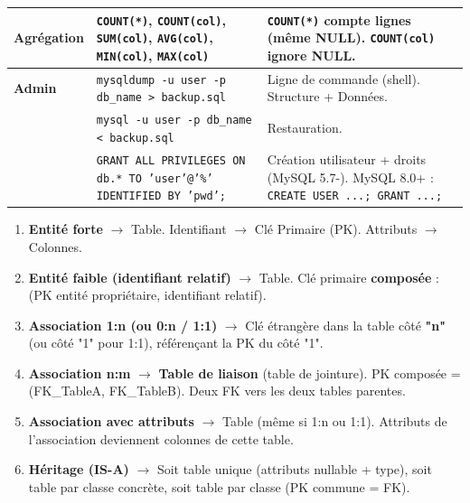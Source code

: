 \documentclass[11pt]{article}
\newcounter{popsec}
\newcounter{popsub}
\newcommand{\courssub}[1]{%
  \stepcounter{popsub}%
  \par\vspace{9pt}\noindent{\popxbold\fontsize{11.5}{13}\selectfont\color{popink}{\color{poporange}\thepopsec.\thepopsub}\hspace{6pt}#1}\par\nopagebreak\vspace{4pt}
}
\begin{document}
\begin{bilan}
\begin{center}
\begin{tabularx}{\linewidth}{|>{\bfseries}l|X|X|}
\hline
\textbf{Agrégation} & \texttt{COUNT(*)}, \texttt{COUNT(col)}, \texttt{SUM(col)}, \texttt{AVG(col)}, \texttt{MIN(col)}, \texttt{MAX(col)} & \texttt{COUNT(*)} compte lignes (même NULL). \texttt{COUNT(col)} ignore NULL. \\
\hline
\textbf{Admin} & \texttt{mysqldump -u user -p db\_name > backup.sql} & Ligne de commande (shell). Structure + Données. \\
& \texttt{mysql -u user -p db\_name < backup.sql} & Restauration. \\
& \texttt{GRANT ALL PRIVILEGES ON db.* TO 'user'@'\%' IDENTIFIED BY 'pwd';} & Création utilisateur + droits (MySQL 5.7-). MySQL 8.0+ : \texttt{CREATE USER ...; GRANT ...;} \\
\hline
\end{tabularx}
\end{center}

\courssub{Méthodes Express}

\begin{methode}
\begin{enumerate}
\item \textbf{Entité forte} $\to$ Table. Identifiant $\to$ Clé Primaire (PK). Attributs $\to$ Colonnes.
\item \textbf{Entité faible (identifiant relatif)} $\to$ Table. Clé primaire \textbf{composée} : (PK entité propriétaire, identifiant relatif).
\item \textbf{Association 1:n (ou 0:n / 1:1)} $\to$ Clé étrangère dans la table côté \textbf{"n"} (ou côté "1" pour 1:1), référençant la PK du côté "1".
\item \textbf{Association n:m} $\to$ \textbf{Table de liaison} (table de jointure). PK composée = (FK\_TableA, FK\_TableB). Deux FK vers les deux tables parentes.
\item \textbf{Association avec attributs} $\to$ Table (même si 1:n ou 1:1). Attributs de l'association deviennent colonnes de cette table.
\item \textbf{Héritage (IS-A)} $\to$ Soit table unique (attributs nullable + type), soit table par classe concrète, soit table par classe (PK commune = FK).
\end{enumerate}
\end{methode}


\end{bilan}
\end{document}
